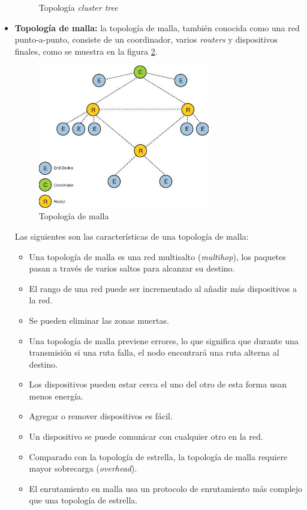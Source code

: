 \documentclass[10pt,journal,compsoc]{IEEEtran}
\begin{document}
\begin{itemize}
\begin{figure}[h]
        \caption{Topología \emph{cluster tree}}
        \label{fig:cluster-tree-topology}
    \end{figure}
    \item \textbf{Topología de malla:}  la topología de malla, también conocida como una red punto-a-punto, consiste de un coordinador, varios \emph{routers} y dispositivos finales, como se muestra en la figura \ref{fig:mesh-topology}.
    \begin{figure}[h]
        \centering
        \includegraphics[width=7.5cm]{mesh-topology}
        \caption{Topología de malla}
        \label{fig:mesh-topology}
    \end{figure}
    Las siguientes son las características de una topología de malla:
    \begin{itemize}
        \item Una topología de malla es una red multisalto (\emph{multihop}), los paquetes pasan a través de varios saltos para alcanzar su destino.
        \item El rango de una red puede ser incrementado al añadir más dispositivos a la red.
        \item Se pueden eliminar las zonas muertas.
        \item Una topología de malla previene errores, lo que significa que durante una transmisión si una ruta falla, el nodo encontrará una ruta alterna al destino. 
        \item Los dispositivos pueden estar cerca el uno del otro de esta forma usan menos energía.
        \item Agregar o remover dispositivos es fácil.
        \item Un dispositivo se puede comunicar con cualquier otro en la red.
        \item Comparado con la topología de estrella, la topología de malla requiere mayor sobrecarga (\emph{overhead}).
        \item El enrutamiento en malla usa un protocolo de enrutamiento más complejo que una topología de estrella.
    \end{itemize}    
\end{itemize}
\end{document}
